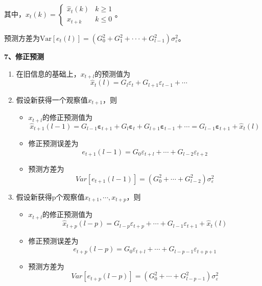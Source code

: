 \documentclass[12pt, a4paper, oneside]{ctexbook}
\begin{document}
其中，$\hat{x}_t(k) = \begin{cases}
        \hat{x}_t(k) & k \geq 1 \\
        x_{t+k}      & k \leq 0
    \end{cases}$。

预测方差为$\mathrm{Var}[e_t(l)]{=}(G_0^2+G_1^2+\cdotp\cdotp\cdotp+G_{l-1}^2)\sigma_\varepsilon^2$。

\textbf{7、修正预测}
\begin{enumerate}[1、]
    \item 在旧信息的基础上，$x_{t+l}$的预测值为
    \begin{equation*}
        \hat{x}_t(l)=G_l\varepsilon_t+G_{l+1}\varepsilon_{t-1}+\cdots 
    \end{equation*}
    \item 假设新获得一个观察值$x_{t+1}$，则
    \begin{itemize}
        \item $x_{t+l}$的修正预测值为
        \begin{equation*}
            \hat{x}_{t+1}(l-1)=G_{l-1}\boldsymbol{\varepsilon}_{t+1}+G_l\boldsymbol{\varepsilon}_t+G_{l+1}\boldsymbol{\varepsilon}_{t-1}+\cdots=G_{l-1}\boldsymbol{\varepsilon}_{t+1}+\hat{x}_t(l)
        \end{equation*}
        \item 修正预测误差为
            $$
                e_{t+1}(l-1)=G_0\varepsilon_{t+l}+\cdots+G_{l-2}\varepsilon_{t+2}
            $$
        \item 预测方差为
        $$
        Var[e_{t+1}(l-1)]=(G_0^2+\cdots+G_{l-2}^2)\sigma_\varepsilon^2
        $$
    \end{itemize}
    \item 假设新获得p个观察值$x_{t+1},\cdots,x_{t+p}$，则
    \begin{itemize}
        \item $x_{t+l}$的修正预测值为
        \begin{equation}
            \hat{x}_{t+p}(l-p)=G_{l-p}\varepsilon_{t+p}+\cdots+G_{l-1}\varepsilon_{t+1}+\hat{x}_t(l)
        \end{equation}
        \item 修正预测误差为
        \begin{equation}
            e_{t+p}(l-p)=G_0\varepsilon_{t+l}+\cdots+G_{l-p-1}\varepsilon_{t+p+1}
        \end{equation}
        \item 预测方差为
        \begin{equation}
            Var[e_{t+p}(l-p)]=(G_0^2+\cdots+G_{l-p-1}^2)\sigma_\varepsilon^2
        \end{equation}
    \end{itemize}
\end{enumerate}
\end{document}
